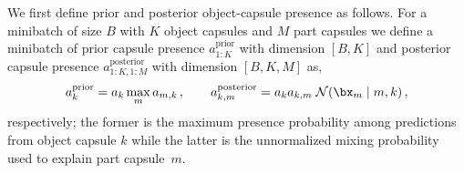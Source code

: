 We first define prior and posterior object-capsule presence as follows.
For a minibatch of size {\small$B$} with {\small$K$} object capsules and $M$ part capsules we define a minibatch of prior capsule presence $a^\mathrm{prior}_{1:K}$ with dimension {\small$[B, K]$} and posterior capsule presence $a^\mathrm{posterior}_{1:K,1:M}$ with dimension {\small$[B, K, M]$} as,
\vspace*{-.2em}
\begin{equation}
    a^\mathrm{prior}_k = a_k \max_m a_{m,k}\,,
    \qquad
    a^\mathrm{posterior}_{k,m} = a_k a_{k,m}\;\gauss{\bx_m \mid m,k}\,,
\end{equation}
respectively; the former is the maximum presence probability among predictions from object capsule $k$ while the latter is the unnormalized mixing probability used to explain part capsule~$m$.
\vspace*{-.5em}
